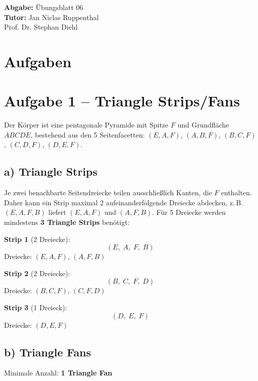 \documentclass[11pt,a4paper]{article}
\title{\course}
\author{\studentname\\Matrikelnummer: \studentnumber\\\institute}
\date{\today}
\newcommand{\sheetnumber}{06}
\newcommand{\tutor}{Jan Niclas Ruppenthal\\Prof. Dr. Stephan Diehl}
\begin{document}
\maketitle

\begin{center}
    \textbf{Abgabe:} \"Ubungsblatt \sheetnumber \\
    \vspace{4mm}
    \textbf{Tutor:} \tutor
\end{center}

\bigskip

\section*{Aufgaben}

\section{Aufgabe 1 -- Triangle Strips/Fans}

Der K\"orper ist eine pentagonale Pyramide mit Spitze $F$ und
Grundfl\"ache $ABCDE$, bestehend aus den 5 Seitenfacetten:
$(E,A,F)$, $(A,B,F)$, $(B,C,F)$, $(C,D,F)$, $(D,E,F)$.

\subsection*{a) Triangle Strips}

Je zwei benachbarte Seitendreiecke teilen ausschlie\ss{}lich Kanten,
die $F$ enthalten. Daher kann ein Strip maximal 2 aufeinanderfolgende
Dreiecke abdecken, z.\,B.\ $(E,A,F,B)$ liefert $(E,A,F)$ und $(A,F,B)$.
F\"ur 5 Dreiecke werden mindestens \textbf{3 Triangle Strips} ben\"otigt:

\medskip
\noindent\textbf{Strip 1} (2 Dreiecke):
\[
  (E,\; A,\; F,\; B)
\]
Dreiecke: $(E,A,F)$,\; $(A,F,B)$

\noindent\textbf{Strip 2} (2 Dreiecke):
\[
  (B,\; C,\; F,\; D)
\]
Dreiecke: $(B,C,F)$,\; $(C,F,D)$

\noindent\textbf{Strip 3} (1 Dreieck):
\[
  (D,\; E,\; F)
\]
Dreiecke: $(D,E,F)$

\subsection*{b) Triangle Fans}

Minimale Anzahl: \textbf{1 Triangle Fan}
\end{document}
